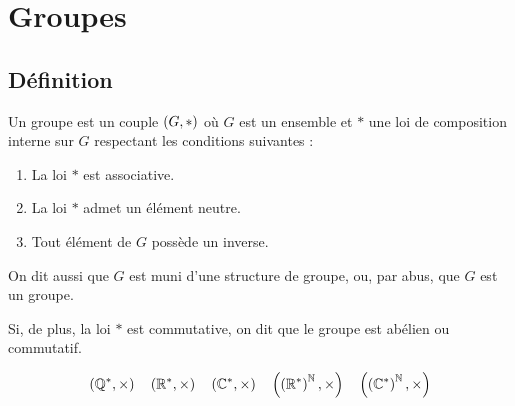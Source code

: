 \section{Groupes}

\subsection{Définition}

\begin{defi}[Groupe]
Un groupe est un couple \(\groupe{G}[*]\) où \(G\) est un ensemble et \(*\) une loi de composition interne sur \(G\) respectant les conditions suivantes :

\begin{enumerate}
\item La loi \(*\) est associative. \\

\item La loi \(*\) admet un élément neutre. \\

\item Tout élément de \(G\) possède un inverse.
\end{enumerate}

On dit aussi que \(G\) est muni d'une structure de groupe, ou, par abus, que \(G\) est un groupe.

Si, de plus, la loi \(*\) est commutative, on dit que le groupe est abélien ou commutatif.
\end{defi}

\begin{ex}
\[\groupe{\Qs}[\times]\quad\groupe{\Rs}[\times]\quad\groupe{\Cs}[\times]\quad\groupe{\paren{\Rs}^\N}[\times]\quad\groupe{\paren{\Cs}^\N}[\times]\]
\end{ex}

